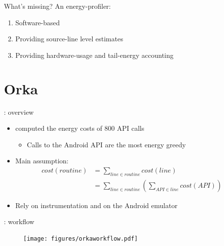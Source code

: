 %
%
\begin{frame}{What's missing?}
An energy-profiler:
\begin{enumerate}
\item \alert{Software-based}
\item Providing \alert{source-line level} estimates
\item Providing hardware-usage and \alert{tail-energy} accounting
\end{enumerate}
\end{frame}
%
%
\section{Orka}
\begin{frame}{\orka{}: overview}
\begin{itemize}
\item \lv{} \cite{linares2014mining} computed the energy costs of 800 API calls
\begin{itemize}
\item Calls to the Android API are the most energy greedy
\end{itemize}
\item Main assumption:
\begin{align*}
cost(routine) &= \sum_{line \in routine} cost(line) \\
&=  \sum_{line \in routine} \left( \sum_{API \in line} cost(API) \right)
\end{align*}
\item Rely on \alert{instrumentation} and on the Android \alert{emulator}
\end{itemize}
\end{frame}
%
%
\begin{frame}{\orka{}: workflow}
\begin{figure}
        \texttt{[image: figures/orkaworkflow.pdf]}
\end{figure}
\end{frame}
%
%
